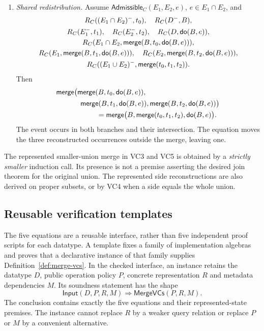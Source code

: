 \begin{definition}
\begin{enumerate}[label=\textbf{VC\arabic*.},leftmargin=*,itemsep=.65em]
\item \emph{Shared redistribution.} Assume $\mathsf{Admissible}_C(E_1,E_2,e)$,
$e\in E_1\cap E_2$, and
\[
\begin{gathered}
 R_C((E_1\cap E_2)^-,t_0),\quad R_C(D^-,B),\\
 R_C(E_1^-,t_1),\quad R_C(E_2^-,t_2),\quad R_C(D,\mathsf{do}(B,e)),\\
 R_C(E_1\cap E_2,\mathsf{merge}(B,t_0,\mathsf{do}(B,e))),\\
 R_C(E_1,\mathsf{merge}(B,t_1,\mathsf{do}(B,e))),\quad
 R_C(E_2,\mathsf{merge}(B,t_2,\mathsf{do}(B,e))),\\
 R_C((E_1\cup E_2)^-,\mathsf{merge}(t_0,t_1,t_2)).
\end{gathered}
\]
Then
\[
\begin{aligned}
 &\F{merge}\bigl(\F{merge}(B,t_0,\F{do}(B,e)),\\
 &\hspace{12mm}\F{merge}(B,t_1,\F{do}(B,e)),\F{merge}(B,t_2,\F{do}(B,e))\bigr)\\
 &\hspace{20mm}=\F{merge}\bigl(B,\F{merge}(t_0,t_1,t_2),\F{do}(B,e)\bigr).
\end{aligned}
\]
The event occurs in both branches and their intersection. The equation
moves the three reconstructed occurrences outside the merge, leaving one.
\end{enumerate}
The represented smaller-union merge in VC3 and VC5 is obtained by a
\emph{strictly smaller} induction call. Its presence is not a premise
asserting the desired join theorem for the original union. The represented
side reconstructions are also derived on proper subsets, or by VC4 when a
side equals the whole union.
\end{definition}

\subsection*{Reusable verification templates}
\label{sec:verification-templates}
The five equations are a reusable interface, rather than five independent
proof scripts for each datatype. A template fixes a family of implementation
algebras and proves that a declarative instance of that family supplies
Definition~\ref{def:merge-vcs}. In the checked interface, an instance retains
the datatype $D$, public operation policy $P$, concrete representation $R$
and metadata dependencies $M$. Its soundness statement has the shape
\[
 \mathsf{Input}(D,P,R,M)\Longrightarrow\mathsf{MergeVCs}(P,R,M).
\]
The conclusion contains exactly the five equations and their represented-state
premises. The instance cannot replace $R$ by a weaker query relation or replace
$P$ or $M$ by a convenient alternative.

